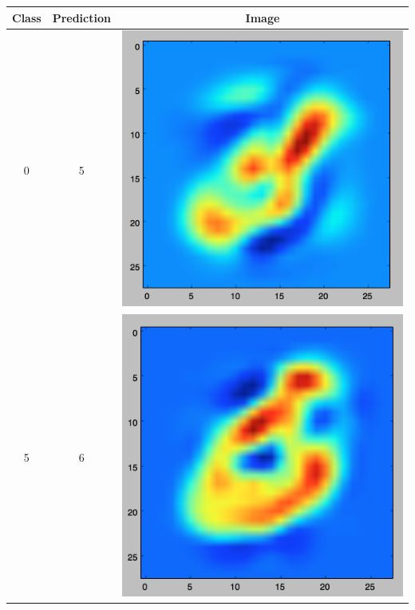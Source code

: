 \documentclass[11pt]{article}
\begin{document}
\begin{table}[!th]
\centering
\begin{tabular}{|c|c|c|}
\hline
Class & Prediction & Image \\
\hline
0 & 5 & \includegraphics[scale=.15]{images/knn5_0_5.png} \\
\hline
5 & 6 & \includegraphics[scale=.15]{images/knn5_5_6.png} \\

\end{tabular}
\end{table}
\end{document}
